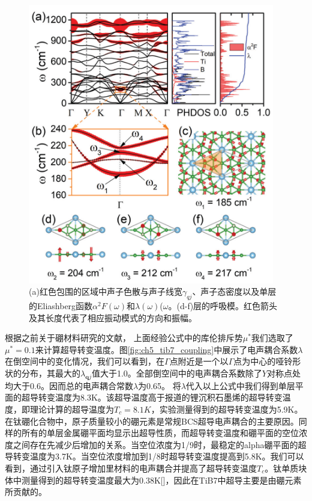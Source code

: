 \begin{figure}
  \includegraphics[width=0.96\textwidth]{figs/ch5_tib7_sc_all.png}
  \centering
  \caption{(a)红色包围的区域中声子色散与声子线宽$\gamma_{qj}$、声子态密度以及单层的Eliashberg函数$\alpha^2 F(\omega)$和$\lambda(\omega)$($\omega$。(d-f)层的呼吸模。红色箭头及其长度代表了相应振动模式的方向和振幅。}
  \label{fig:ch5_tib7_sc_all}
\end{figure}

根据之前关于硼材料研究的文献\cite{penev2016can,zhao2016superconductivity,zhao2018multigap,liao2017phonon,yan2020superconductivity}，
上面经验公式中的库伦排斥势$\mu^*$我们选取了$\mu^*=0.1$来计算超导转变温度。图\ref{fig:ch5_tib7_coupling}中展示了电声耦合系数$\lambda$在倒空间中的变化情况，我们可以看到，在$\Gamma$点附近是一个以$\Gamma$点为中心的哑铃形状的分布，其最大的$\lambda_{\bm{q}j}$值大于\num{1.0}。全部倒空间中的电声耦合系数除了$Y$对称点处均大于\num{0.6}。因而总的电声耦合常数$\lambda$为\num{0.65}。
将$\lambda$代入以上公式中我们得到单层平面的超导转变温度为\num{8.3}K。该超导温度高于报道的锂沉积石墨烯的超导转变温度，即理论计算的超导温度为$T_c=8.1K$\cite{profeta2012phonon}，实验测量得到的超导转变温度为\num{5.9}K\cite{ludbrook2015evidence}。
在钛硼化合物中，原子质量较小的硼元素是常规BCS超导电声耦合的主要原因。同样的所有的单层金属硼平面均显示出超导性质，而超导转变温度和硼平面的空位浓度之间存在先减少后增加的关系。当空位浓度为\num{1/9}时，最稳定的alpha硼平面的超导转变温度为3.7K。当空位浓度增加到1/8时超导转变温度提高到5.8K。我们可以看到，通过引入钛原子增加里材料的电声耦合并提高了超导转变温度$T_c$。钛单质块体中测量得到的超导转变温度最大为0.38K[]，因此在TiB7中超导主要是由硼元素所贡献的。


